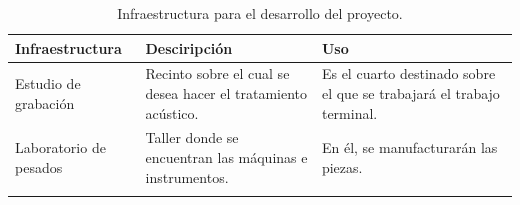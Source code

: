 \begin{center}
\footnotesize
    \begin{longtable}[!htb]{| m{10em} | m{12em} | m{12em}|}
    \hline
    \textbf{Infraestructura}& \textbf{Desciripci\'on} & \textbf{Uso} \\
    \hline\hline
    Estudio de grabaci\'on & Recinto sobre el cual se desea hacer el tratamiento acústico. & Es el cuarto destinado sobre el que se trabajará el trabajo terminal.\\
    \hline
    Laboratorio de pesados & Taller donde se encuentran las máquinas e instrumentos. & En él, se manufacturarán las piezas.\\
    \hline

    \caption{Infraestructura para el desarrollo del proyecto.}
    \label{tab:Infraestructura}
    \end{longtable}
\end{center}
